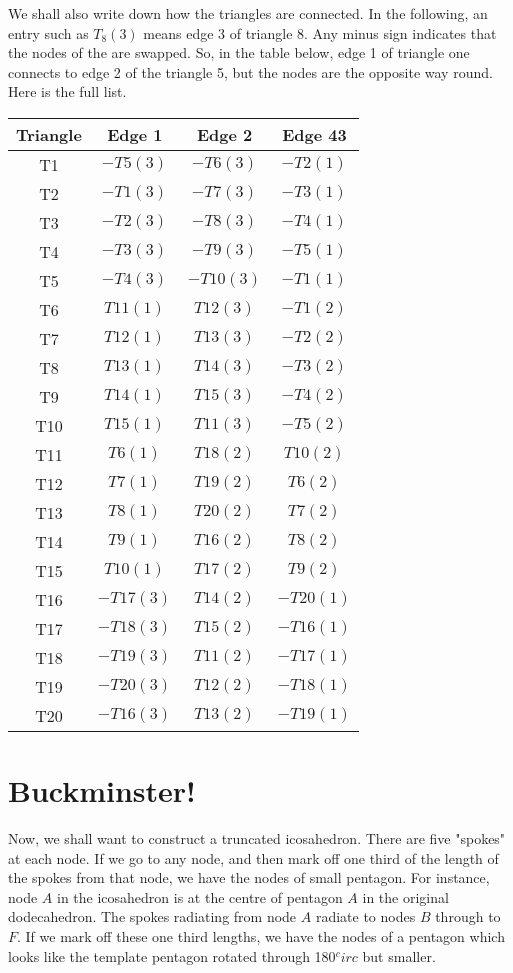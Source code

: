 \documentclass[12pt]{article}
\begin{document}
We shall also write down how the triangles are connected. In the following, an
entry such as $T_8(3)$ means edge 3 of triangle 8. Any minus sign indicates that the 
nodes of the are swapped. So, in the table below, edge 1 of triangle one connects
to edge 2 of the triangle 5, but the nodes are the opposite way round. Here is
the full list.
\begin{center}
\begin{tabular}{| c | c | c | c | }
\hline
Triangle &  Edge 1& Edge 2 & Edge 43  \\
\hline
  T1& $-T5(3)$ & $-T6(3)$ & $-T2(1)$  \\
  T2& $-T1(3)$ & $-T7(3)$ & $-T3(1)$  \\
  T3& $-T2(3)$ & $-T8(3)$ & $-T4(1)$  \\
  T4& $-T3(3)$ & $-T9(3)$ & $-T5(1)$  \\
  T5& $-T4(3)$ & $-T10(3)$ & $-T1(1)$  \\
  T6& $T11(1)$ & $T12(3)$ & $-T1(2)$  \\
  T7& $T12(1)$ & $T13(3)$ & $-T2(2)$  \\
  T8& $T13(1)$ & $T14(3)$ & $-T3(2)$  \\
  T9& $T14(1)$ & $T15(3)$ & $-T4(2)$  \\
  T10& $T15(1)$ & $T11(3)$ & $-T5(2)$  \\
  T11& $T6(1)$ & $T18(2)$ & $T10(2)$  \\
  T12& $T7(1)$ & $T19(2)$ & $T6(2)$  \\
  T13& $T8(1)$ & $T20(2)$ & $T7(2)$  \\
  T14& $T9(1)$ & $T16(2)$ & $T8(2)$  \\
  T15& $T10(1)$ & $T17(2)$ & $T9(2)$  \\
  T16& $-T17(3)$ & $T14(2)$ & $-T20(1)$  \\
  T17& $-T18(3)$ & $T15(2)$ & $-T16(1)$  \\
  T18& $-T19(3)$ & $T11(2)$ & $-T17(1)$  \\
  T19& $-T20(3)$ & $T12(2)$ & $-T18(1)$  \\
  T20& $-T16(3)$ & $T13(2)$ & $-T19(1)$  \\
\hline
\end{tabular}
\end{center}

\section{Buckminster!}

Now, we shall want to construct a truncated icosahedron. There are five "spokes"
at each node. If we go to any node, and then mark off one third of the length
of the spokes from that node, we have the nodes of small pentagon. For instance,
 node $A$ in the icosahedron is at the centre of pentagon $A$ in the original
dodecahedron. The spokes radiating from node $A$ radiate to nodes $B$ through to $F$.
If we mark off these one third lengths, we have the nodes of a pentagon which
looks like the template pentagon rotated through 180$^circ$ but smaller.
\end{document}
